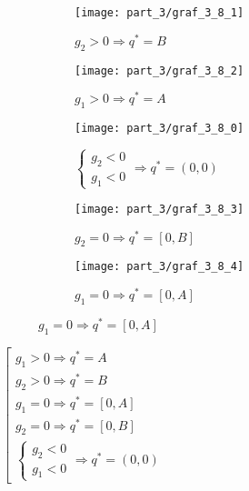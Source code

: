 	\begin{figure}[H]
    	\centering
     	\begin{subfigure}[b]{0.3 \textwidth}
        	\centering
        	\texttt{[image: part\_3/graf\_3\_8\_1]}
        	\caption{$g_2 > 0 \Rightarrow q^*=B$}
     	\end{subfigure}
     	\begin{subfigure}[b]{0.3 \textwidth}
        	\centering
        	\texttt{[image: part\_3/graf\_3\_8\_2]}
        	\caption{$g_1 > 0 \Rightarrow q^*=A$}
     	\end{subfigure}
     	\begin{subfigure}[b]{0.3 \textwidth}
        	\centering
        	\texttt{[image: part\_3/graf\_3\_8\_0]}
        	\caption{$
        	\begin{cases}			
				g_2 < 0 \\
				g_1 < 0
			\end{cases}	\Rightarrow q^*=(0,0)
			$}
     	\end{subfigure}
    	\centering
     	\begin{subfigure}[b]{0.3 \textwidth}
        	\centering
        	\texttt{[image: part\_3/graf\_3\_8\_3]}
        	\caption{$g_2 = 0 \Rightarrow q^*=[0,B]$}
     	\end{subfigure}
     	\begin{subfigure}[b]{0.3 \textwidth}
        	\centering
        	\texttt{[image: part\_3/graf\_3\_8\_4]}
        	\caption{$g_1 = 0 \Rightarrow q^*=[0,A]$}
     	\end{subfigure}
	\end{figure}


	
	\begin{center}
		$\left[
		\begin{gathered}
			g_1 > 0 \Rightarrow q^*=A \\
			g_2 > 0 \Rightarrow q^*=B \\			
			g_1 = 0 \Rightarrow q^*=[0,A] \\
			g_2 = 0 \Rightarrow q^*=[0,B] \\			
			\begin{cases}			
				g_2 < 0 \\
				g_1 < 0
			\end{cases}	\Rightarrow q^*=(0,0)
		\end{gathered}
		\right.$	
	\end{center}


